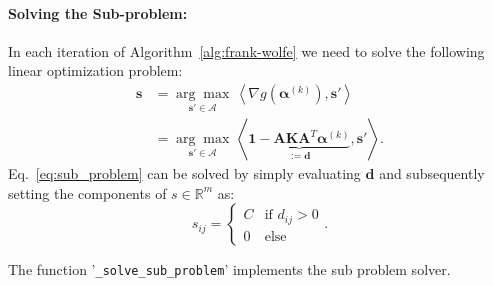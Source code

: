 \documentclass[10p]{article}
\newcommand{\defi}{:=}
\newcommand{\balpha}{\boldsymbol{\alpha}}
\newcommand{\bones}{\mathbf{1}}
\newcommand{\numpair}{m}
\begin{document}
\paragraph{Solving the Sub-problem:}
In each iteration of Algorithm~\ref{alg:frank-wolfe} we need to solve the following linear optimization problem:
\begin{align}
    \mathbf{s}
        &=\underset{\mathbf{s}'\in\mathcal{A}}{\arg\max}\,\left\langle\nabla g(\balpha^{(k)}),\mathbf{s}'\right\rangle\\
        &=\underset{\mathbf{s}'\in\mathcal{A}}{\arg\max}\,\left\langle\underbrace{\bones-\mathbf{A}\mathbf{K}\mathbf{A}^T\balpha^{(k)}}_{\defi\mathbf{d}},\mathbf{s}'\right\rangle.\label{eq:sub_problem}
\end{align}
Eq.~\eqref{eq:sub_problem} can be solved by simply evaluating $\mathbf{d}$ and subsequently setting the components of $s\in\mathbb{R}^{\numpair}$ as:
\begin{equation}
    s_{ij}=\begin{cases}
            C&\text{if }d_{ij}>0\\
            0&\text{else}
           \end{cases}.
\end{equation}
\begin{mdframed}[style=codeframe]
    The function '\texttt{\_solve\_sub\_problem}' implements the sub problem solver.
\end{mdframed}
\end{document}
